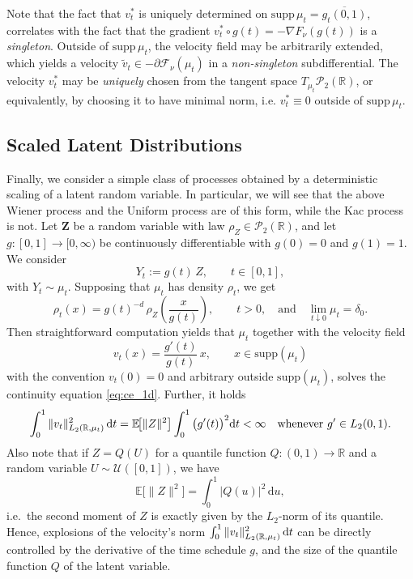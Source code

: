 \documentclass{article}
\newcommand{\R}{\mathbb{R}}
\renewcommand{\d}{\, \mathrm{d}}
\newcommand{\zb}[1]{\ensuremath{\boldsymbol{#1}}}
\newcommand{\supp}{\mathrm{supp}}
\theoremstyle{plain}
\theoremstyle{definition}
\theoremstyle{remark}
\begin{document}
Note that the fact that $v_t^*$ is uniquely determined on $\supp \, \mu_t = \overline{g_t(0,1)}$, correlates with the fact that the gradient $v_t^* \circ g(t) = - \nabla F_\nu(g(t))$ is a \emph{singleton}. Outside of $\supp \, \mu_t$, the velocity field may be arbitrarily extended, which yields a velocity $\tilde v_t \in - \partial \mathcal{F}_\nu(\mu_t)$ in a \emph{non-singleton} subdifferential. The velocity $v_t^*$ may be \emph{uniquely} chosen from the tangent space $T_{\mu_t} \mathcal{P}_2(\R)$, or equivalently, by choosing it to have minimal norm, i.e. $v_t^* \equiv 0$ outside of $\supp \, \mu_t$.

{\subsection{Scaled Latent Distributions} \label{app:scaled_latent}
Finally, we consider a simple class of processes obtained by a deterministic scaling of a latent random variable. In particular, we will see that the above Wiener process and the Uniform process are of this form, while the Kac process is not.
Let $\zb Z$ be a random variable with law $\rho_Z \in \mathcal P_2(\R)$, and let $g \colon [0,1]\to [0,\infty)$ be continuously differentiable with $g(0)=0$ and $g(1)=1$. We consider
\begin{equation}\label{eq:lin-def}
    Y_t := g(t)\,  Z, \qquad t \in [0,1],
\end{equation}
with $Y_t \sim \mu_t$. Supposing that $\mu_t$ has density $\rho_t$, we get
\begin{equation}\label{eq:lin-density}
    \rho_t(x) = g(t)^{-d}\, \rho_Z\!\left(\frac{x}{g(t)}\right), \qquad t>0,
    \quad\text{and}\quad \lim_{t\downarrow 0}\mu_t = \delta_0.
\end{equation}
Then  straightforward computation yields that $\mu_t$ together with the
velocity field
\begin{equation}\label{eq:lin-velo}
        v_t(x) = \frac{g'(t)}{g(t)}\, x, \qquad x \in \supp(\mu_t)
 \end{equation}
with the convention $v_t(0)=0$ and arbitrary outside $\supp(\mu_t)$,
solves the continuity equation \eqref{eq:ce_1d}.
Further, it holds
\begin{equation}\label{eq:finite}
        \int_0^1 \|v_t\|_{L_2(\R,\mu_t)}^2 \, {\rm d}t
        = \mathbb E\!\big[\|Z\|^2\big] \int_0^1 \big(g'(t)\big)^2 {\rm d}t < \infty
        \quad \text{whenever } g' \in L_2(0,1).
\end{equation}
Also note that if $Z = Q(U)$ for a quantile function $Q:(0,1) \to \R$ and a random variable $U \sim \mathcal{U}([0,1])$, we have
\begin{equation}
   \mathbb E\!\big[\|Z\|^2\big] =  \int_0^1 |Q(u)|^2 \d u,
\end{equation}
i.e.\ the second moment of $Z$ is exactly given by the $L_2$-norm of its quantile. Hence, explosions of the velocity's norm $\int_0^1 \|v_t\|_{L_2(\R,\mu_t)}^2 \, {\rm d}t$ can be directly controlled by the derivative of the time schedule $g$, and the size of the quantile function $Q$ of the latent variable.



}
\end{document}
